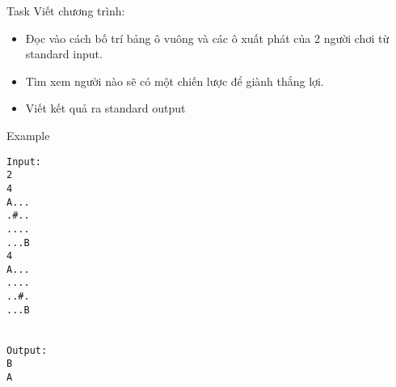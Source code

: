 Task
Viết chương trình:  
\begin{itemize}
	\item     Đọc vào cách bố trí bảng ô vuông và các ô xuất phát của 2 người chơi từ standard input.   
	\item     Tìm xem người nào sẽ có một chiến lược để giành thắng lợi.   
	\item     Viết kết quả ra standard output   
\end{itemize}
Example
\begin{verbatim}
Input:
2
4
A...
.#..
....
...B
4
A...
....
..#.
...B


Output:
B
A

\end{verbatim}